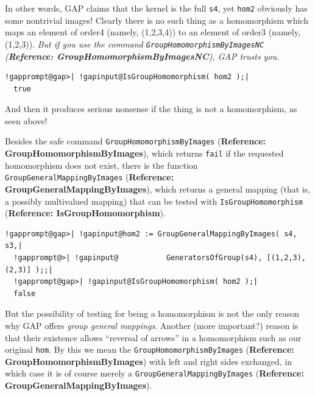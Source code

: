 \documentclass[a4paper,11pt]{report}
\begin{document}
{{ In other words, \textsf{GAP} claims that the kernel is the full \texttt{s4}, yet \texttt{hom2} obviously has some non\texttt{}trivial images! Clearly there is no
such thing as a homomorphism which maps an element of order{\nobreakspace}4
(namely, (1,2,3,4)) to an element of order{\nobreakspace}3 (namely, (1,2,3)). \emph{But if you use the command \texttt{GroupHomomorphismByImagesNC} (\textbf{Reference: GroupHomomorphismByImagesNC}), \textsf{GAP} trusts you.} 

 
\begin{Verbatim}[commandchars=!@|,fontsize=\small,frame=single,label=Example]
  !gapprompt@gap>| !gapinput@IsGroupHomomorphism( hom2 );|
  true
\end{Verbatim}
 

 And then it produces serious nonsense if the thing is not a homomorphism, as
seen above! 

 Besides the safe command \texttt{GroupHomomorphismByImages} (\textbf{Reference: GroupHomomorphismByImages}), which returns \texttt{fail} if the requested homomorphism does not exist, there is the function \texttt{GroupGeneralMappingByImages} (\textbf{Reference: GroupGeneralMappingByImages}), which returns a general mapping (that is, a possibly
multi\texttt{}valued mapping) that can be tested with \texttt{IsGroupHomomorphism} (\textbf{Reference: IsGroupHomomorphism}). 

 
\begin{Verbatim}[commandchars=!@|,fontsize=\small,frame=single,label=Example]
  !gapprompt@gap>| !gapinput@hom2 := GroupGeneralMappingByImages( s4, s3,|
  !gapprompt@>| !gapinput@           GeneratorsOfGroup(s4), [(1,2,3),(2,3)] );;|
  !gapprompt@gap>| !gapinput@IsGroupHomomorphism( hom2 );|
  false
\end{Verbatim}
 

   But the possibility of testing for being a homomorphism is not the only reason
why \textsf{GAP} offers \emph{group general mappings}. Another (more important?) reason is that their existence allows ``reversal of arrows'' in a homomorphism such as our original \texttt{hom}. By this we mean the \texttt{GroupHomomorphismByImages} (\textbf{Reference: GroupHomomorphismByImages}) with left and right sides exchanged, in which case it is of course merely a \texttt{GroupGeneralMappingByImages} (\textbf{Reference: GroupGeneralMappingByImages}). 

}}
\end{document}
